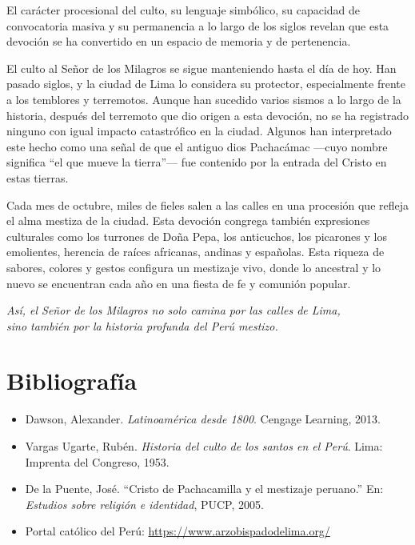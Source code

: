 \documentclass[a4paper,12pt]{article}
\begin{document}
		El carácter procesional del culto, su lenguaje simbólico, su capacidad de convocatoria masiva y su permanencia a lo largo de los siglos revelan que esta devoción se ha convertido en un espacio de memoria y de pertenencia.
		
		\vspace{3mm}
		
		\noindent
		El culto al Señor de los Milagros se sigue manteniendo hasta el día de hoy. Han pasado siglos, y la ciudad de Lima lo considera su protector, especialmente frente a los temblores y terremotos. Aunque han sucedido varios sismos a lo largo de la historia, después del terremoto que dio origen a esta devoción, no se ha registrado ninguno con igual impacto catastrófico en la ciudad. Algunos han interpretado este hecho como una señal de que el antiguo dios Pachacámac —cuyo nombre significa “el que mueve la tierra”— fue contenido por la entrada del Cristo en estas tierras.
		
		Cada mes de octubre, miles de fieles salen a las calles en una procesión que refleja el alma mestiza de la ciudad. Esta devoción congrega también expresiones culturales como los turrones de Doña Pepa, los anticuchos, los picarones y los emolientes, herencia de raíces africanas, andinas y españolas. Esta riqueza de sabores, colores y gestos configura un mestizaje vivo, donde lo ancestral y lo nuevo se encuentran cada año en una fiesta de fe y comunión popular.
		
		\begin{center}
			\textit{Así, el Señor de los Milagros no solo camina por las calles de Lima,\\
				sino también por la historia profunda del Perú mestizo.}
		\end{center}
		
	
		\section*{Bibliografía}
		
		\begin{itemize}
			\item Dawson, Alexander. \textit{Latinoamérica desde 1800}. Cengage Learning, 2013.
			\item Vargas Ugarte, Rubén. \textit{Historia del culto de los santos en el Perú}. Lima: Imprenta del Congreso, 1953.
			\item De la Puente, José. “Cristo de Pachacamilla y el mestizaje peruano.” En: \textit{Estudios sobre religión e identidad}, PUCP, 2005.
			\item Portal católico del Perú: \url{https://www.arzobispadodelima.org/}
		\end{itemize}
		
\end{document}
